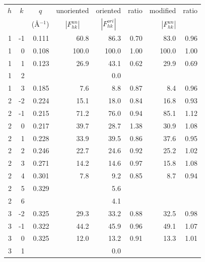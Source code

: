 \begin{table}[htbp]
  \centering
  \begin{tabular}{rrrrrrrr}
    \hline
    \multicolumn{1}{c}{$h$} & \multicolumn{1}{c}{$k$} & \multicolumn{1}{c}{$q$} & \multicolumn{1}{c}{unoriented} & \multicolumn{1}{c}{oriented} & \multicolumn{1}{c}{ratio} & \multicolumn{1}{c}{modified} & \multicolumn{1}{c}{ratio} \\
     & & \multicolumn{1}{c}{(\AA$^{-1}$)} & \multicolumn{1}{c}{$|F_{hk}^{un}|$} & \multicolumn{1}{c}{$|F_{hk}^{ori}|$} &  & $\left|F_{hk}^{un}\right|$ & \\
    \hline
    1 & -1 & {\color{red}0.111}   & 60.8  & 86.3  & 0.70 & 83.0  & 0.96 \\
    1 &  0 & {\color{red}0.108}   & 100.0 & 100.0 & 1.00 & 100.0 & 1.00 \\
    1 &  1 & 0.123                & 26.9  & 43.1  & 0.62 & 29.9  & 0.69 \\
    1 &  2 &                      &       & 0.0   &      &       &      \\
    1 &	 3 & 0.185                & 7.6   & 8.8   & 0.87 & 8.4   & 0.96 \\
    2 &	-2 & 0.224                & 15.1  & 18.0  & 0.84 & 16.8  & 0.93 \\
    2 &	-1 & {\color{blue}0.215}  & 71.2  & 76.0  & 0.94 & 85.1  & 1.12 \\
    2 &  0 & {\color{blue}0.217}  & 39.7  & 28.7  & 1.38 & 30.9  & 1.08 \\
    2 &	 1 & 0.228                & 33.9  & 39.5  & 0.86 & 37.6  & 0.95 \\
    2 &  2 & 0.246                & 22.7  & 24.6  & 0.92 & 25.2  & 1.02 \\
    2 &	 3 & 0.271                & 14.2  & 14.6  & 0.97 & 15.8  & 1.08 \\
    2 &  4 & 0.301                & 7.8   & 9.2   & 0.85 & 8.7   & 0.94 \\
    2 &  5 & 0.329                &       & 5.6   &      &       &      \\
    2 &  6 &                      &       & 4.1   &      &       &      \\
	  3 &	-2 & {\color{green}0.325} & 29.3  & 33.2  & 0.88 & 32.5  & 0.98 \\
    3 & -1 & 0.322                & 44.2  & 45.9  & 0.96 & 49.1  & 1.07 \\
    3 &  0 & {\color{green}0.325} & 12.0  & 13.2  & 0.91 & 13.3  & 1.01 \\
    3 &  1 &                      &       & 0.0   &      &       &      \\

\end{tabular}
\end{table}
